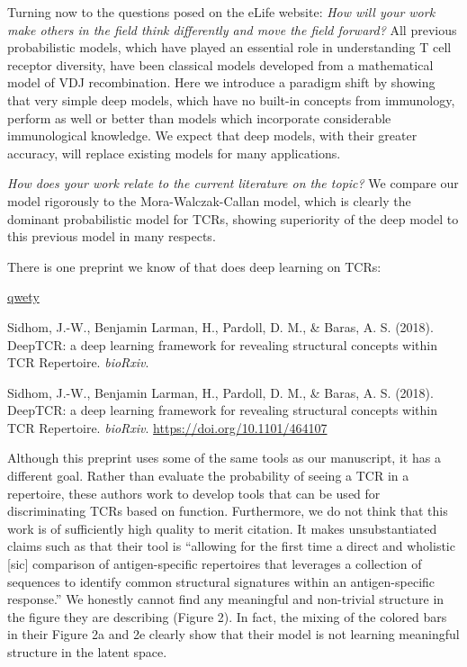 \documentclass[letterpaper,10pt]{article}
\begin{document}
Turning now to the questions posed on the eLife website:
\textit{How will your work make others in the field think differently and move the field forward?}
All previous probabilistic models, which have played an essential role in understanding T cell receptor diversity, have been classical models developed from a mathematical model of VDJ recombination.
Here we introduce a paradigm shift by showing that very simple deep models, which have no built-in concepts from immunology, perform as well or better than models which incorporate considerable immunological knowledge.
We expect that deep models, with their greater accuracy, will replace existing models for many applications.

\vspace{4pt} \textit{How does your work relate to the current literature on the topic?}
We compare our model rigorously to the Mora-Walczak-Callan model, which is clearly the dominant probabilistic model for TCRs, showing superiority of the deep model to this previous model in many respects.

There is one preprint we know of that does deep learning on TCRs:

\url{qwety}

Sidhom, J.-W., Benjamin Larman, H., Pardoll, D. M., \& Baras, A. S. (2018). DeepTCR: a deep learning framework for revealing structural concepts within TCR Repertoire. \emph{bioRxiv}. 

Sidhom, J.-W., Benjamin Larman, H., Pardoll, D. M., \& Baras, A. S. (2018). DeepTCR: a deep learning framework for revealing structural concepts within TCR Repertoire. \emph{bioRxiv}. \url{https://doi.org/10.1101/464107}

Although this preprint uses some of the same tools as our manuscript, it has a different goal.
Rather than evaluate the probability of seeing a TCR in a repertoire, these authors work to develop tools that can be used for discriminating TCRs based on function.
Furthermore, we do not think that this work is of sufficiently high quality to merit citation.
It makes unsubstantiated claims such as that their tool is ``allowing for the first time a direct and wholistic [sic] comparison of antigen-specific repertoires that leverages a collection of sequences to identify common structural signatures within an antigen-specific response.''
We honestly cannot find any meaningful and non-trivial structure in the figure they are describing (Figure 2).
In fact, the mixing of the colored bars in their Figure 2a and 2e clearly show that their model is not learning meaningful structure in the latent space.
\end{document}
